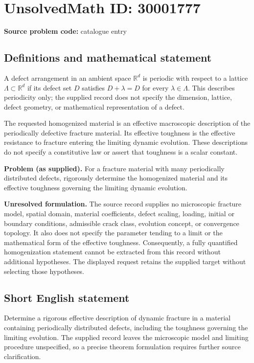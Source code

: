 \documentclass[11pt]{article}
\newcommand{\R}{\mathbb{R}}
\begin{document}
\section*{UnsolvedMath ID: 30001777}
\textbf{Source problem code:} catalogue entry
\subsection{Definitions and mathematical statement}
A defect arrangement in an ambient space \(\R^d\) is periodic with respect to a lattice \(\Lambda\subset\R^d\) if its defect set \(D\) satisfies \(D+\lambda=D\) for every \(\lambda\in\Lambda\). This describes periodicity only; the supplied record does not specify the dimension, lattice, defect geometry, or mathematical representation of a defect.

The requested homogenized material is an effective macroscopic description of the periodically defective fracture material. Its effective toughness is the effective resistance to fracture entering the limiting dynamic evolution. These descriptions do not specify a constitutive law or assert that toughness is a scalar constant.

\textbf{Problem (as supplied).} For a fracture material with many periodically distributed defects, rigorously determine the homogenized material and its effective toughness governing the limiting dynamic evolution.

\textbf{Unresolved formulation.} The source record supplies no microscopic fracture model, spatial domain, material coefficients, defect scaling, loading, initial or boundary conditions, admissible crack class, evolution concept, or convergence topology. It also does not specify the parameter tending to a limit or the mathematical form of the effective toughness. Consequently, a fully quantified homogenization statement cannot be extracted from this record without additional hypotheses. The displayed request retains the supplied target without selecting those hypotheses.
\subsection{Short English statement}
Determine a rigorous effective description of dynamic fracture in a material containing periodically distributed defects, including the toughness governing the limiting evolution. The supplied record leaves the microscopic model and limiting procedure unspecified, so a precise theorem formulation requires further source clarification.
\end{document}
